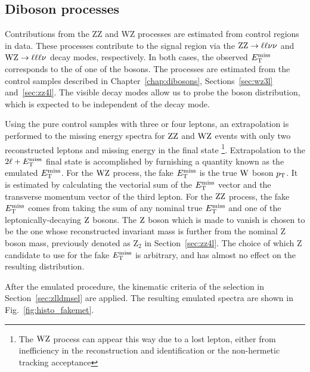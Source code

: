 
\subsection{Diboson processes}
\label{sec:vvbkg}
Contributions from the ZZ and WZ processes are estimated from control regions in data.
These processes contribute to the signal region via the
$\mathrm{Z}\mathrm{Z}\rightarrow\ell\ell\nu\nu$ and $\mathrm{W}\mathrm{Z}\rightarrow\ell\ell\ell\nu$ decay modes, respectively.
In both cases, the observed $E_\mathrm{T}^{\mathrm{miss}}$ corresponds to the \pt of one of the bosons.
The processes are estimated from the control samples described in Chapter~\ref{chap:dibosons}, Sections~\ref{sec:wz3l} and~\ref{sec:zz4l}. 
The visible decay modes allow us to probe the boson \pt distribution, which is expected to be independent of the decay mode.

Using the pure control samples with three or four leptons, an extrapolation is performed
to the missing energy spectra for $\mathrm{Z}\mathrm{Z}$ and $\mathrm{W}\mathrm{Z}$ events 
with only two reconstructed leptons and missing energy in the final state
\footnote{The $\mathrm{W}\mathrm{Z}$ process can appear this way due to a lost lepton, either from inefficiency in the reconstruction and identification or the non-hermetic tracking acceptance}.
Extrapolation to the $2\ell+E_\mathrm{T}^{\mathrm{miss}}$ final state is accomplished by furnishing a quantity
known as the emulated $E_\mathrm{T}^{\mathrm{miss}}$.
For the $\mathrm{W}\mathrm{Z}$ process, the fake $E_\mathrm{T}^{\mathrm{miss}}$ is the true $\mathrm{W}$ boson $p_{\mathrm{T}}$.
It is estimated by calculating the vectorial sum of the $E_\mathrm{T}^{\mathrm{miss}}$ vector and the transverse momentum vector of the third lepton.
For the $\mathrm{Z}\mathrm{Z}$ process, the fake $E_\mathrm{T}^{\mathrm{miss}}$ comes from taking the sum of any nominal true $E_\mathrm{T}^{\mathrm{miss}}$ and one of the leptonically-decaying $\mathrm{Z}$ bosons.
The $\mathrm{Z}$ boson which is made to vanish is chosen to be the one whose reconstructed invariant
mass is further from the nominal Z boson mass, previously denoted
as $\mathrm{Z}_2$ in Section~\ref{sec:zz4l}.
The choice of which Z candidate to use for the fake $E_\mathrm{T}^{\mathrm{miss}}$ is arbitrary,
and has almost no effect on the resulting distribution.

After the emulated \met procedure, the kinematic criteria of the selection in
Section~\ref{sec:zlldmsel} are applied.
The resulting emulated \met spectra are shown in Fig.~\ref{fig:histo_fakemet}.

